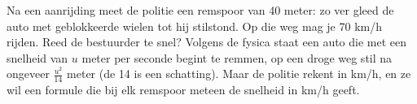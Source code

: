 %


\begin{probleem}
Na een aanrijding meet de politie een remspoor van 40 meter: zo ver gleed de auto met geblokkeerde wielen tot hij stilstond. Op die weg mag je 70 km/h rijden. Reed de bestuurder te snel? Volgens de fysica staat een auto die met een snelheid van $u$ meter per seconde begint te remmen, op een droge weg stil na ongeveer $\frac{u^2}{14}$ meter (de 14 is een schatting). Maar de politie rekent in km/h, en ze wil een formule die bij elk remspoor meteen de snelheid in km/h geeft.

\end{probleem}

